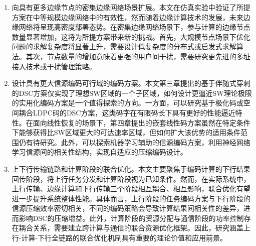 \begin{enumerate} [ label = （\arabic*）]
    \item 向具有更多边缘节点的密集边缘网络场景扩展。本文在仿真实验中验证了所提方案在中等规模边缘网络中的有效性，然而随着边缘计算技术的发展，未来边缘网络将呈现高密度部署态势。在密集边缘网络场景下，参与计算的边缘节点数量显著增加，这将为所提方案带来新的挑战。首先，大规模节点场景下优化问题的求解复杂度将显著上升，需要设计低复杂度的分布式或启发式求解算法。其次，节点数量的增加意味着更强的用户间干扰，需要研究更先进的多址接入技术或干扰管理策略。

    \item 设计具有更大信源编码可行域的编码方案。本文第三章提出的基于伴随式穿刺的DSC方案仅实现了理想SW区域的一个子区域，如何设计更逼近SW理论极限的实用化编码方案是一个值得探索的方向。一方面，可以研究基于极化码或空间耦合LDPC码的DSC方案，这类码字在有限码长下具有更好的性能逼近特性。在面向线性恢复的场景下，第四章提出的嵌套线性码方案虽然在特定条件下能够获得比SW区域更大的可达速率区域，但如何扩大该优势的适用条件范围仍有待研究。此外，可以探索机器学习辅助的信源编码方案，利用神经网络学习信源间的相关性结构，实现自适应的压缩编码设计。

    \item 上下行传输链路和计算阶段的联合优化。本文主要聚焦于编码计算的下行结果回传阶段，将上行任务分发和计算阶段视为已知条件。然而，在实际系统中，上行传输、边缘计算和下行传输三个阶段相互耦合、相互影响，联合优化有望进一步提升系统整体性能。具体而言，上行阶段的任务编码方案与下行阶段的信源压缩效率密切相关，不同的编码策略会导致计算结果间相关性的差异，进而影响DSC的压缩增益。此外，计算阶段的资源分配与通信阶段的功率控制存在耦合关系，需要建立跨计算与通信的联合资源优化框架。因此，研究涵盖上行-计算-下行全链路的联合优化机制具有重要的理论价值和应用前景。
\end{enumerate}

